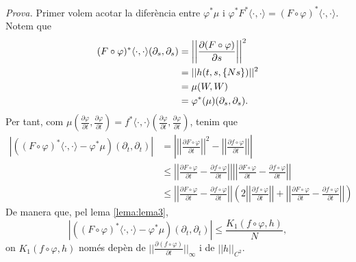 {
\color{green!50!black}
\textit{Prova.} Primer volem acotar la diferència entre $\varphi^*\mu$ i $\varphi^*F^*\langle\cdot, \cdot\rangle = (F\circ\varphi)^*\langle\cdot, \cdot\rangle$. Notem que 
\begin{align*}
    (F\circ\varphi)^*\langle\cdot, \cdot\rangle(\partial_s, \partial_s) 
    &= \left|\left|\frac{\partial(F\circ\varphi)}{\partial s}\right|\right|^2
    \\
    &= ||h(t,s,\{Ns\})||^2
    \\
    &= \mu(W,W)
    \\
    &= \varphi^*(\mu)(\partial_s, \partial_s).
\end{align*}
Per tant, com $\mu\left(\frac{\partial\varphi}{\partial t},\frac{\partial\varphi}{\partial t}\right) = f^*\langle\cdot, \cdot\rangle\left(\frac{\partial\varphi}{\partial t},\frac{\partial\varphi}{\partial t}\right)$, tenim que
\begin{align*}
    |((F\circ\varphi)^*\langle\cdot, \cdot\rangle - \varphi^*\mu)(\partial_t, \partial_t)| 
    &= 
    \left|
    \left|\left|  \frac{\partial F\circ\varphi}{\partial t} \right|\right|^2 - \left|\left|\frac{\partial f\circ\varphi}{\partial t}\right|\right|
    \right|
    \\
    &\le \left|\left|\frac{\partial F\circ\varphi}{\partial t} - \frac{\partial f\circ\varphi}{\partial t}\right|\right|\left|\left|\frac{\partial F\circ\varphi}{\partial t} - \frac{\partial f\circ\varphi}{\partial t}\right|\right|
    \\
    &\le \left|\left|\frac{\partial F\circ\varphi}{\partial t} - \frac{\partial f\circ\varphi}{\partial t}\right|\right|\left(2\left|\left|\frac{\partial f\circ\varphi}{\partial t}\right|\right|+\left|\left|\frac{\partial F\circ\varphi}{\partial t} - \frac{\partial f\circ\varphi}{\partial t}\right|\right|\right)
\end{align*}
De manera que, pel lema \ref{lema:lema3},
\begin{equation*}
    |((F\circ\varphi)^*\langle\cdot, \cdot\rangle - \varphi^*\mu)(\partial_t, \partial_t)| \le \frac{K_1(f\circ\varphi,h)}{N},
\end{equation*}
on $K_1(f\circ\varphi,h)$ només depèn de $||\frac{\partial(f\circ\varphi)}{\partial t}||_\infty$ i de $||h||_{C^2}$. 

}
